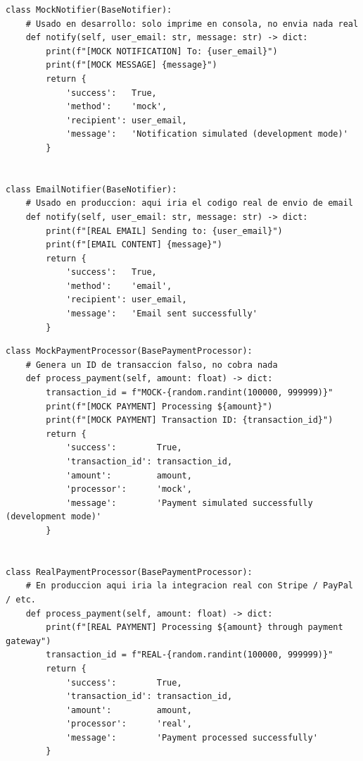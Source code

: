 \documentclass[12pt, a4paper]{article}
\begin{document}
\begin{lstlisting}[caption={orders/infra/notifiers.py -- MockNotifier y EmailNotifier}]
class MockNotifier(BaseNotifier):
    # Usado en desarrollo: solo imprime en consola, no envia nada real
    def notify(self, user_email: str, message: str) -> dict:
        print(f"[MOCK NOTIFICATION] To: {user_email}")
        print(f"[MOCK MESSAGE] {message}")
        return {
            'success':   True,
            'method':    'mock',
            'recipient': user_email,
            'message':   'Notification simulated (development mode)'
        }


class EmailNotifier(BaseNotifier):
    # Usado en produccion: aqui iria el codigo real de envio de email
    def notify(self, user_email: str, message: str) -> dict:
        print(f"[REAL EMAIL] Sending to: {user_email}")
        print(f"[EMAIL CONTENT] {message}")
        return {
            'success':   True,
            'method':    'email',
            'recipient': user_email,
            'message':   'Email sent successfully'
        }
\end{lstlisting}

\begin{lstlisting}[caption={orders/infra/payment.py -- MockPaymentProcessor y RealPaymentProcessor}]
class MockPaymentProcessor(BasePaymentProcessor):
    # Genera un ID de transaccion falso, no cobra nada
    def process_payment(self, amount: float) -> dict:
        transaction_id = f"MOCK-{random.randint(100000, 999999)}"
        print(f"[MOCK PAYMENT] Processing ${amount}")
        print(f"[MOCK PAYMENT] Transaction ID: {transaction_id}")
        return {
            'success':        True,
            'transaction_id': transaction_id,
            'amount':         amount,
            'processor':      'mock',
            'message':        'Payment simulated successfully (development mode)'
        }


class RealPaymentProcessor(BasePaymentProcessor):
    # En produccion aqui iria la integracion real con Stripe / PayPal / etc.
    def process_payment(self, amount: float) -> dict:
        print(f"[REAL PAYMENT] Processing ${amount} through payment gateway")
        transaction_id = f"REAL-{random.randint(100000, 999999)}"
        return {
            'success':        True,
            'transaction_id': transaction_id,
            'amount':         amount,
            'processor':      'real',
            'message':        'Payment processed successfully'
        }
\end{lstlisting}
\end{document}
